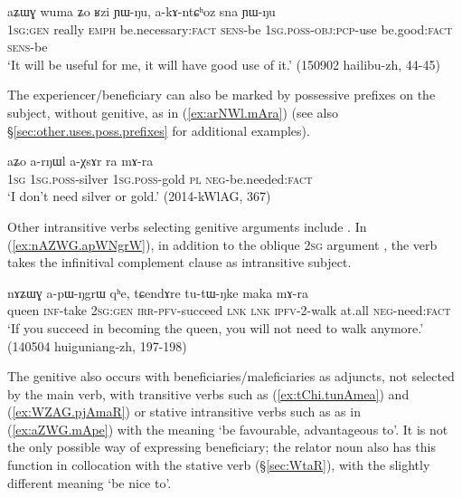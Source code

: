\begin{exe}
\ex \label{ex:aZWG.Rzi}
 \gll aʑɯɣ wuma ʑo ʁzi ɲɯ-ŋu, a-kɤ-ntɕʰoz sna ɲɯ-ŋu \\
  \textsc{1sg}:\textsc{gen} really \textsc{emph} be.necessary:\textsc{fact} \textsc{sens}-be \textsc{1sg}.\textsc{poss}-\textsc{obj}:\textsc{pcp}-use be.good:\textsc{fact}  \textsc{sens}-be \\
  \glt `It will be useful for me, it will have good use of it.'  (150902 hailibu-zh, 44-45)
\end{exe}

The experiencer/beneficiary can also be marked by possessive prefixes on the subject, without genitive, as in (\ref{ex:arNWl.mAra}) (see also §\ref{sec:other.uses.poss.prefixes} for additional examples).

\begin{exe}
\ex \label{ex:arNWl.mAra}
 \gll aʑo a-rŋɯl a-χsɤr ra mɤ-ra \\
 \textsc{1sg} \textsc{1sg}.\textsc{poss}-silver \textsc{1sg}.\textsc{poss}-gold \textsc{pl} \textsc{neg}-be.needed:\textsc{fact} \\
 \glt `I don't  need silver or gold.' (2014-kWlAG, 367)
\end{exe}

Other intransitive verbs selecting genitive arguments include . In (\ref{ex:nAZWG.apWNgrW}), in addition to the oblique \textsc{2sg} argument , the verb takes the infinitival complement clause  as intransitive subject.

\begin{exe}
\ex \label{ex:nAZWG.apWNgrW}
  nɤʑɯɣ a-pɯ-ŋgrɯ qʰe, tɕendɤre tu-tɯ-ŋke maka mɤ-ra \\
queen \textsc{inf}-take \textsc{2sg}:\textsc{gen} \textsc{irr}-\textsc{pfv}-succeed \textsc{lnk} \textsc{lnk} \textsc{ipfv}-2-walk at.all \textsc{neg}-need:\textsc{fact} \\
\glt `If you succeed in becoming the queen, you will not need to walk anymore.' (140504 huiguniang-zh, 197-198)
\end{exe}

The genitive also occurs with beneficiaries/maleficiaries as adjuncts, not selected by the main verb, with transitive verbs such as  (\ref{ex:tChi.tunAmea}) and  (\ref{ex:WZAG.pjAmaR}) or stative intransitive verbs such as  as in (\ref{ex:aZWG.mApe}) with the meaning `be favourable, advantageous to'.  It is not the only possible way of expressing beneficiary; the relator noun  also has this function in collocation with the stative verb  (§\ref{sec:WtaR}), with the slightly different meaning `be nice to'.


